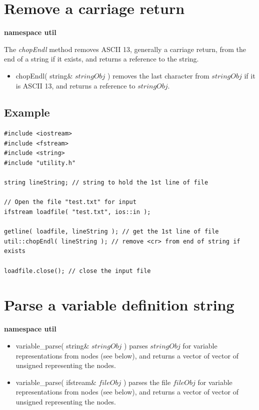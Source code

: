 \documentclass{report}
\begin{document}
\section{Remove a carriage return}

{\bf namespace util}

The {\em chopEndl} method removes ASCII 13, generally a carriage
return, from the end of a string if it exists, and returns a reference
to the string.

\begin{itemize}
\item chopEndl( string\& $stringObj$ ) removes the last character from
      $stringObj$ if it is ASCII 13, and returns a reference to
      $stringObj$.
\end{itemize}

\subsection{Example}
\begin{verbatim}
#include <iostream>
#include <fstream>
#include <string>
#include "utility.h"

string lineString; // string to hold the 1st line of file

// Open the file "test.txt" for input
ifstream loadfile( "test.txt", ios::in );

getline( loadfile, lineString ); // get the 1st line of file
util::chopEndl( lineString ); // remove <cr> from end of string if
exists

loadfile.close(); // close the input file
\end{verbatim}

\section{Parse a variable definition string}\label{parsefx}

{\bf namespace util}

\begin{itemize}
\item variable\_parse( string\& $stringObj$ ) parses $stringObj$ for
      variable representations from nodes (see below), and returns a
      vector of vector of unsigned representing the nodes.
\item variable\_parse( ifstream\& $fileObj$ ) parses the file
      $fileObj$ for variable representations from nodes (see below),
      and returns a vector of vector of unsigned representing the
      nodes.
\end{itemize}
\end{document}
